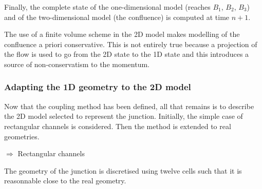Finally, the complete state of the one-dimensional model (reaches $B_1$, $B_2$, $B_3$) and of the two-dimensional model (the confluence) is computed at time $n+1$.

The use of a finite volume scheme in the 2D model makes modelling of the confluence a priori conservative. This is not entirely true because a projection of the flow is used to go from the 2D state to the 1D state and this introduces a source of non-conservatism to the momentum.

\subsubsection{Adapting the 1D geometry to the 2D model}

Now that the coupling method has been defined, all that remains is to describe the 2D model selected to represent the junction. Initially, the simple case of rectangular channels is considered. Then the method is extended to real geometries.

$\Longrightarrow$ Rectangular channels

The geometry of the junction is discretised using twelve cells such that it is reasonnable close to the real geometry.

